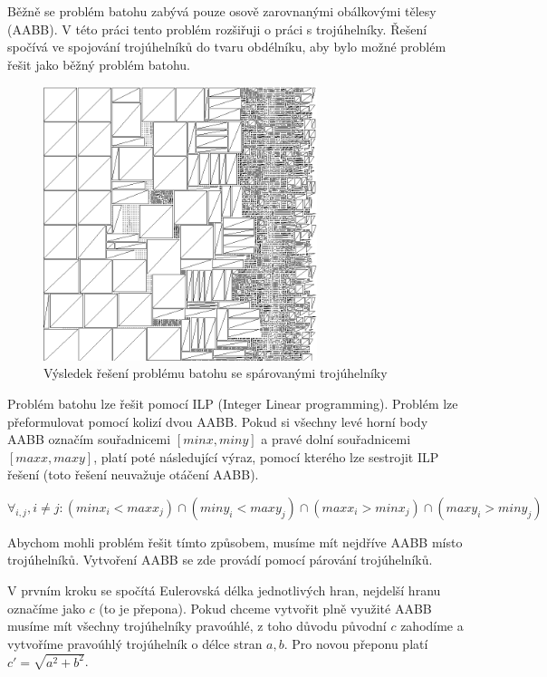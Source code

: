 \documentclass[11pt,twoside,a4paper]{book}
\begin{document}
Běžně se problém batohu zabývá pouze osově zarovnanými obálkovými tělesy (AABB). V této práci tento problém rozšiřuji o práci s trojúhelníky. Řešení spočívá ve spojování trojúhelníků do tvaru obdélníku, aby bylo možné problém řešit jako běžný problém batohu.

\begin{center}
\begin{figure}[h]
\includegraphics[width=80mm]{figures/lmcoords.png}
\caption{Výsledek řešení problému batohu se spárovanými trojúhelníky}
\end{figure}
\end{center}
\newpage

Problém batohu lze řešit pomocí ILP (Integer Linear programming). Problém lze přeformulovat pomocí kolizí dvou AABB. Pokud si všechny levé horní body AABB označím souřadnicemi $[minx, miny]$ a pravé dolní souřadnicemi $[maxx, maxy]$, platí poté následující výraz, pomocí kterého lze sestrojit ILP řešení (toto řešení neuvažuje otáčení AABB).

$\forall_{i,j}, i \neq j: (minx_i < maxx_j) \cap (miny_i < maxy_j) \cap (maxx_i > minx_j) \cap (maxy_i > miny_j)$
\bigskip

Abychom mohli problém řešit tímto způsobem, musíme mít nejdříve AABB místo trojúhelníků. Vytvoření AABB se zde provádí pomocí párování trojúhelníků. 

V prvním kroku se spočítá Eulerovská délka jednotlivých hran, nejdelší hranu označíme jako $c$ (to je přepona). Pokud chceme vytvořit plně využité AABB musíme mít všechny trojúhelníky pravoúhlé, z toho důvodu původní $c$ zahodíme a vytvoříme pravoúhlý trojúhelník o délce stran $a, b$. Pro novou přeponu platí $c' = \sqrt{a^2 + b^2}$.
\end{document}
